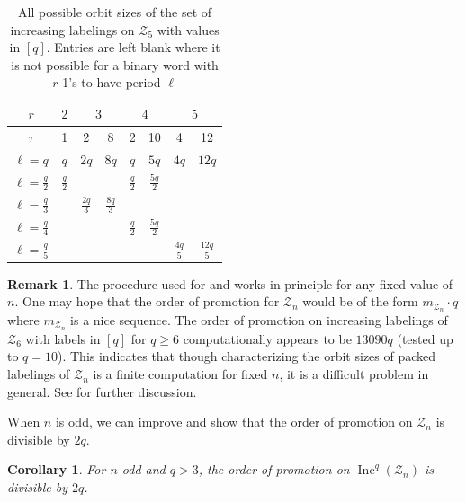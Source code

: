 \documentclass[11pt]{amsart}
\newtheorem{corollary}[theorem]{Corollary}
\theoremstyle{definition}
\newtheorem{remark}[theorem]{Remark}
\DeclareMathOperator{\Inc}{\mathrm{Inc}}
\newcommand{\calZ}{\mathcal{Z}}
\begin{document}
\begin{table}[htbp]
    \centering
    \renewcommand{\arraystretch}{1.5}
    \setlength{\tabcolsep}{10pt}
    \begin{tabular}{|c||c|c|c|c|c|c|c|}\hline
        $r $ & $2$ & \multicolumn{2}{c|}{$3$} & \multicolumn{2}{c|}{$4$} & \multicolumn{2}{c|}{$5$}\\\hline
      $\tau $   & 1 & 2 & 8 & 2 & 10 & 4 & 12\\\hline\hline
    $\ell = q$ & $q$ & $2q$& $8q$ & $q$& $5q$& $4q$ & $12q$\\\hline
    $\ell = \frac{q}{2}$ & $\frac{q}{2}$ & & & $\frac{q}{2}$& $\frac{5q}{2}$& & \\\hline
    $\ell = \frac{q}{3}$ & & $\frac{2q}{3}$& $\frac{8q}{3}$& & & & \\\hline
    $\ell = \frac{q}{4}$ & & & &$\frac{q}{2}$  & $\frac{5q}{2}$ & & \\\hline
    $\ell = \frac{q}{5}$ & & & & & & $\frac{4q}{5}$ & $\frac{12q}{5}$\\\hline
    \end{tabular}
    \caption{All possible orbit sizes of the set of increasing labelings on $\calZ_5$ with values in $[q]$. Entries are left blank where it is not possible for a binary word with $r$ 1's to have period $\ell$ }
    \label{tab:Z5Orbits}
\end{table}

\begin{remark}\label{rmk:OrderOnZnLargern}
The procedure used for  and  works in principle for any fixed value of $n$. One may hope that the order of promotion for $\calZ_n$ would be of the form $m_{\calZ_n}\cdot q$ where $m_{\calZ_n}$ is a nice sequence. The order of promotion on increasing labelings of $\calZ_6$ with labels in $[q]$ for $q\geq 6$ computationally appears to be $13090q$ (tested up to $q=10$). This indicates that though characterizing the orbit sizes of packed labelings of $\calZ_n$ is a finite computation for fixed $n$, it is a difficult problem in general. See  for further discussion.
\end{remark}


When $n$ is odd, we can improve  and show that the order of promotion on $\mathcal{Z}_n$ is divisible by $2q$. 

\begin{corollary}
For $n$ odd and $q > 3$, the order of promotion on $\Inc^q(\calZ_n)$ is divisible by $2q$. 
\end{corollary}
\end{document}
